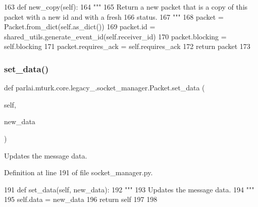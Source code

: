 \begin{DoxyCode}
163     \textcolor{keyword}{def }new\_copy(self):
164         \textcolor{stringliteral}{"""}
165 \textcolor{stringliteral}{        Return a new packet that is a copy of this packet with a new id and with a fresh}
166 \textcolor{stringliteral}{        status.}
167 \textcolor{stringliteral}{        """}
168         packet = Packet.from\_dict(self.as\_dict())
169         packet.id = shared\_utils.generate\_event\_id(self.receiver\_id)
170         packet.blocking = self.blocking
171         packet.requires\_ack = self.requires\_ack
172         \textcolor{keywordflow}{return} packet
173 
\end{DoxyCode}
\mbox{\label{classparlai_1_1mturk_1_1core_1_1legacy__2018_1_1socket__manager_1_1Packet_a3e06e555eadd65177cea1346992cf9b8}} 
\subsubsection{\texorpdfstring{set\+\_\+data()}{set\_data()}}
{\footnotesize\ttfamily def parlai.\+mturk.\+core.\+legacy\+\_.\+socket\+\_\+manager.\+Packet.\+set\+\_\+data (\begin{DoxyParamCaption}\item[{}]{self,  }\item[{}]{new\+\_\+data }\end{DoxyParamCaption})}

\begin{DoxyVerb}Updates the message data.
\end{DoxyVerb}
 

Definition at line 191 of file socket\+\_\+manager.\+py.


\begin{DoxyCode}
191     \textcolor{keyword}{def }set\_data(self, new\_data):
192         \textcolor{stringliteral}{"""}
193 \textcolor{stringliteral}{        Updates the message data.}
194 \textcolor{stringliteral}{        """}
195         self.data = new\_data
196         \textcolor{keywordflow}{return} self
197 
198 
\end{DoxyCode}
\mbox{\label{classparlai_1_1mturk_1_1core_1_1legacy__2018_1_1socket__manager_1_1Packet_a268873d6b357e25768ce83ed2ad605f6}} 
